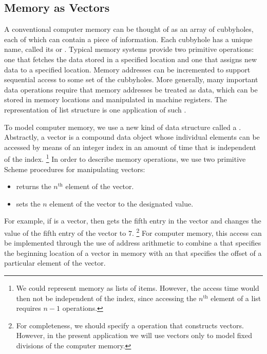 \subsection{Memory as Vectors}
\label{Section 5.3.1}

A conventional computer memory can be thought of as an array of cubbyholes, each of which can contain a piece of information.
Each cubbyhole has a unique name, called its  or .
Typical memory systems provide two primitive operations:
one that fetches the data stored in a specified location and one that assigns new data to a specified location.
Memory addresses can be incremented to support sequential access to some set of the cubbyholes.
More generally, many important data operations require that memory addresses be treated as data, which can be stored in memory locations and manipulated in machine registers.
The representation of list structure is one application of such .

To model computer memory, we use a new kind of data structure called a .
Abstractly, a vector is a compound data object whose individual elements can be accessed by means of an integer index in an amount of time that is independent of the index.%
\footnote{
	We could represent memory as lists of items.
	However, the access time would then not be independent of the index, since accessing the \( n^{\mathrm{th}} \) element of a list requires \( n - 1 \)  operations.
}
In order to describe memory operations, we use two primitive Scheme procedures for manipulating vectors:
\begin{itemize}

	\item
		 returns the \( n^{\mathrm{th}} \) element of the vector.

	\item
		 sets the \( n \) element of the vector to the designated value.

\end{itemize}
For example, if  is a vector, then  gets the fifth entry in the vector  and  changes the value of the fifth entry of the vector  to \( 7 \).%
\footnote{
	For completeness, we should specify a  operation that constructs vectors.
	However, in the present application we will use vectors only to model fixed divisions of the computer memory.
}
For computer memory, this access can be implemented through the use of address arithmetic to combine a  that specifies the beginning location of a vector in memory with an  that specifies the offset of a particular element of the vector.



